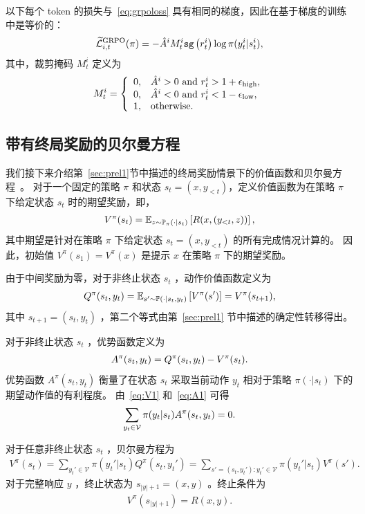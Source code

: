 \documentclass[11pt]{article}
\theoremstyle{definition}
\def\eq#1{\begin{equation*}\begin{split}#1\end{split}\end{equation*}}
\def\eql#1#2{\begin{equation}{#1}\begin{split}#2\end{split}\end{equation}}
\def\pr#1{\left( #1 \right ) }
\def\calL{\mathcal{L}}
\newcommand \eps{\epsilon}
\newcommand\Eb{\mathbb{E}}
\newcommand\adv{\hat{A}}
\newcommand\tpi{\pi}
\newcommand\cpi{\mathbb{P}_{\pi}}
\begin{document}
以下每个 token 的损失与~\eqref{eq:grpoloss} 具有相同的梯度，因此在基于梯度的训练中是等价的：  
\eql{\label{eq:grpoloss-log}}{
    \widetilde{\calL}_{i,t}^{\mathrm{GRPO}}(\pi) = -\adv^i M_t^i \texttt{sg}\pr{r_t^i}\log\pi(y_t^i | s_t^i),
}  
其中，裁剪掩码 $M_t^i$ 定义为
\eql{\label{eq:maskgrpo1}}{
    M_t^i = \left\{\begin{array}{ll} 0, & \adv^i > 0 \text{ and } r_t^i > 1+\eps_{\mathrm{high}}, \\ 0, & \adv^i < 0 \text{ and } r_t^i < 1-\eps_{\mathrm{low}}, \\ 1, & \text{otherwise.} \end{array}\right.
}

\subsection{带有终局奖励的贝尔曼方程}\label{sec:BellmanEquations1}  
我们接下来介绍第~\ref{sec:prel1}节中描述的终局奖励情景下的价值函数和贝尔曼方程~\cite{sutton1998reinforcement}。  
对于一个固定的策略 $\tpi$ 和状态 $s_t = (x, y_{<t})$，定义价值函数为在策略 $\tpi$ 下给定状态 $s_t$ 时的期望奖励，即，  
\eql{\label{eq:V1}}{
    V^\tpi(s_t)
    =
    \Eb_{z \sim \cpi(\cdot|s_t)}\left[R(x,(y_{<t}, z)) \right],
}  
其中期望是针对在策略 $\tpi$ 下给定状态 $s_t = (x, y_{<t})$ 的所有完成情况计算的。  
因此，初始值 $V^{\tpi}(s_1) = V^{\tpi}(x)$ 是提示 $x$ 在策略 $\pi$ 下的期望奖励。  

由于中间奖励为零，对于非终止状态 $s_t$ ，动作价值函数定义为
\eql{\label{eq:Q2}}{
    Q^\tpi(s_t,y_t)
    =
    \mathbb{E}_{s'\sim \mathbb{P}(\cdot| s_t,y_t)}
    \left[V^\tpi(s')\right]= V^{\tpi}(s_{t+1}),
}
其中 $s_{t+1} = (s_t, y_t)$ ，第二个等式由第~\ref{sec:prel1} 节中描述的确定性转移得出。

对于非终止状态 $s_t$ ，优势函数定义为  
\eql{\label{eq:A1}}{
    A^\tpi(s_t,y_t) = Q^\tpi(s_t,y_t) - V^\tpi(s_t).
}  
优势函数 $A^\tpi(s_t,y_t)$ 衡量了在状态 $s_t$ 采取当前动作 $y_t$ 相对于策略 $\tpi(\cdot | s_t)$ 下的期望动作值的有利程度。  
由~\eqref{eq:V1} 和~\eqref{eq:A1} 可得  
\eql{\label{eq:avgA1}}{
    \sum_{y_t \in \mathcal{V}} \tpi(y_t | s_t) A^{\tpi}(s_t, y_t) = 0.  
} 

对于任意非终止状态 $s_t$ ，贝尔曼方程为
\eq{
    V^\tpi(s_t)
    =
    \sum_{y_t'\in \mathcal{V}} \tpi(y_t'| s_t) Q^\tpi(s_t,y_t')
    =
    \sum_{s'=(s_t,y_t'): y_t'\in \mathcal{V}} \tpi(y_t' | s_t) V^{\tpi}(s').
}
对于完整响应 $y$ ，终止状态为 $s_{|y|+1} = (x, y)$ 。终止条件为
\eq{
    V^{\tpi}(s_{|y| + 1}) = R(x,y).
}
\end{document}
